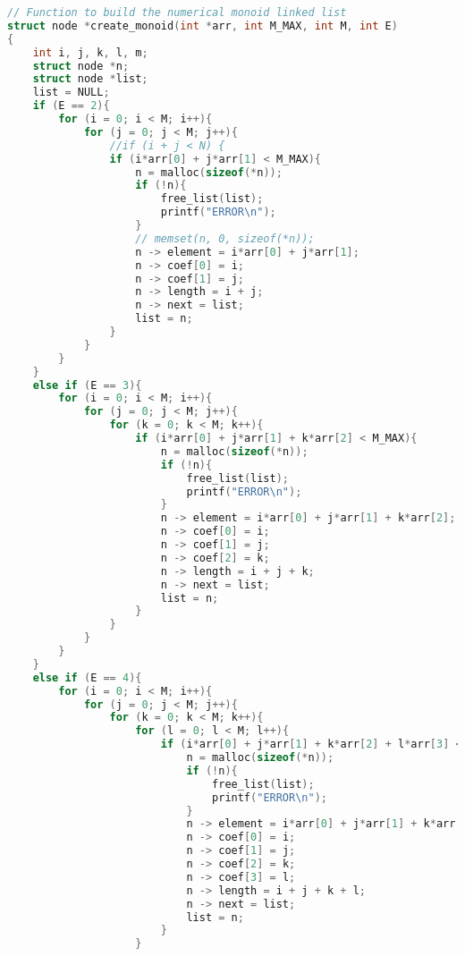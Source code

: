 \begin{lstlisting}[language=C]
// Function to build the numerical monoid linked list
struct node *create_monoid(int *arr, int M_MAX, int M, int E)
{
    int i, j, k, l, m;
    struct node *n;
    struct node *list;
    list = NULL;
    if (E == 2){
        for (i = 0; i < M; i++){
            for (j = 0; j < M; j++){
                //if (i + j < N) {
                if (i*arr[0] + j*arr[1] < M_MAX){
                    n = malloc(sizeof(*n));
                    if (!n){
                        free_list(list);
                        printf("ERROR\n");
                    }
                    // memset(n, 0, sizeof(*n));
                    n -> element = i*arr[0] + j*arr[1];
                    n -> coef[0] = i;
                    n -> coef[1] = j;
                    n -> length = i + j;
                    n -> next = list;
                    list = n;
                }
            }
        }
    }
    else if (E == 3){
        for (i = 0; i < M; i++){
            for (j = 0; j < M; j++){
                for (k = 0; k < M; k++){
                    if (i*arr[0] + j*arr[1] + k*arr[2] < M_MAX){
                        n = malloc(sizeof(*n));
                        if (!n){
                            free_list(list);
                            printf("ERROR\n");
                        }
                        n -> element = i*arr[0] + j*arr[1] + k*arr[2];
                        n -> coef[0] = i;
                        n -> coef[1] = j;
                        n -> coef[2] = k;
                        n -> length = i + j + k;
                        n -> next = list;
                        list = n;
                    }
                }
            }
        }
    }
    else if (E == 4){
        for (i = 0; i < M; i++){
            for (j = 0; j < M; j++){
                for (k = 0; k < M; k++){
                    for (l = 0; l < M; l++){
                        if (i*arr[0] + j*arr[1] + k*arr[2] + l*arr[3] < M_MAX){
                            n = malloc(sizeof(*n));
                            if (!n){
                                free_list(list);
                                printf("ERROR\n");
                            }
                            n -> element = i*arr[0] + j*arr[1] + k*arr[2] + l*arr[3];
                            n -> coef[0] = i;
                            n -> coef[1] = j;
                            n -> coef[2] = k;
                            n -> coef[3] = l;
                            n -> length = i + j + k + l;
                            n -> next = list;
                            list = n;
                        }
                    }

\end{lstlisting}
